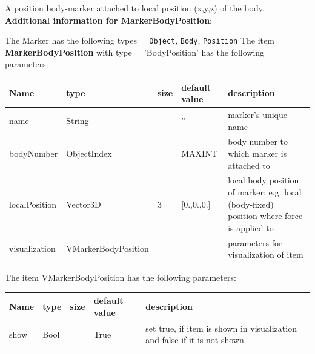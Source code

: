 \ei

%
\newpage

\label{sec:item:MarkerBodyPosition}
A position body-marker attached to local position (x,y,z) of the body.\vspace{12pt}
 \\{\bf Additional information for MarkerBodyPosition}:
\bi
  \item The Marker has the following types = \texttt{Object}, \texttt{Body}, \texttt{Position}
\ei
\vspace{12pt} \noindent The item {\bf MarkerBodyPosition} with type = 'BodyPosition' has the following parameters:\vspace{-1cm}\\ 
\begin{center}
  \footnotesize
  \begin{longtable}{| p{4.5cm} | p{2.5cm} | p{0.5cm} | p{2.5cm} | p{6cm} |}
    \hline
    \bf Name & \bf type & \bf size & \bf default value & \bf description \\ \hline
    name &     String &      &     '' &     marker's unique name\\ \hline
    bodyNumber &     ObjectIndex &      &     MAXINT &     body number to which marker is attached to\\ \hline
    localPosition &     Vector3D &     3 &     [0.,0.,0.] &     local body position of marker; e.g. local (body-fixed) position where force is applied to\\ \hline
    visualization & VMarkerBodyPosition & & & parameters for visualization of item \\ \hline
	  \end{longtable}
	\end{center}
The item VMarkerBodyPosition has the following parameters:\vspace{-1cm}\\ 
\begin{center}
  \footnotesize
  \begin{longtable}{| p{4.5cm} | p{2.5cm} | p{0.5cm} | p{2.5cm} | p{6cm} |}
    \hline
    \bf Name & \bf type & \bf size & \bf default value & \bf description \\ \hline
    show &     Bool &      &     True &     set true, if item is shown in visualization and false if it is not shown\\ \hline
	  \end{longtable}
	\end{center}
